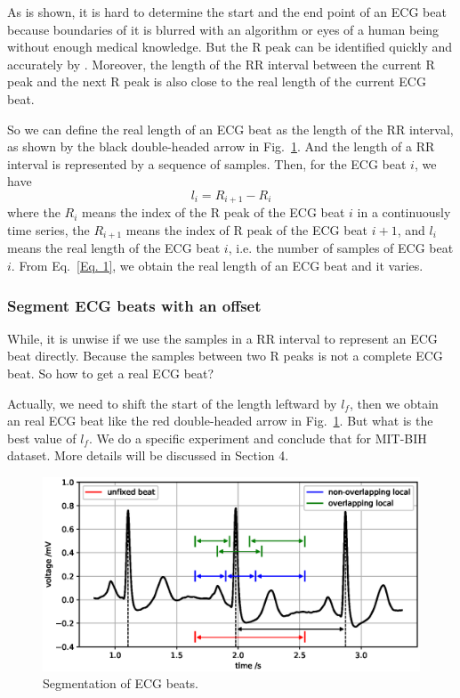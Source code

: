 \documentclass[wcp]{jmlr}
\begin{document}
As is shown, it is hard to determine the start and the end point of an ECG beat because boundaries of it is blurred with an algorithm or eyes of a human being without enough medical knowledge. But the R peak can be identified quickly and accurately by \cite{pan1985real}. Moreover, the length of the RR interval between the current R peak and the next R peak is also close to the real length of the current ECG beat. 


So we can define the real length of an ECG beat as the length of the RR interval, as shown by the black double-headed arrow in Fig.~\ref{Fig 2}. And the length of a RR interval is represented by a sequence of samples. Then, for the ECG beat $i$, we have
\begin{equation}
\label{Eq. 1}
  l_i = R_{i+1} - R_i
\end{equation}
where the $R_i$ means the index of the R peak of the ECG beat $i$ in a continuously time series, the $R_{i+1}$ means the index of R peak of the ECG beat $i+1$, and $l_i$ means the real length of the ECG beat $i$, i.e. the number of samples of ECG beat $i$. From Eq.~\ref{Eq. 1}, we obtain the real length of an ECG beat and it varies.
\subsubsection{Segment ECG beats with an offset}
While, it is unwise if we use the samples in a RR interval to represent an ECG beat directly. Because the samples between two R peaks is not a complete ECG beat. So how to get a real ECG beat?


Actually, we need to shift the start of the length leftward by $l_f$, then we obtain an real ECG beat like the red double-headed arrow in Fig.~\ref{Fig 2}. But what is the best value of $l_f$. We do a specific experiment and conclude that for MIT-BIH dataset. More details will be discussed in Section 4.
\noindent
\begin{figure}[t]
\centering
\includegraphics[scale=0.7]{beat.eps}
\caption{Segmentation of ECG beats.}
\label{Fig 2}
\end{figure}
\end{document}
